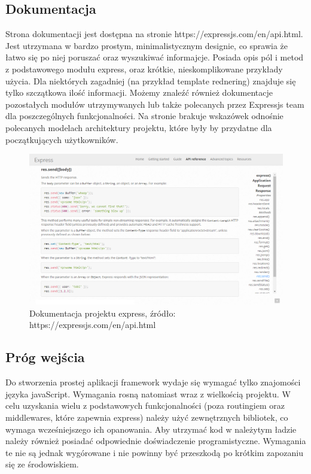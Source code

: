 \documentclass[12pt]{report}
\begin{document}
    \subsection{Dokumentacja}
      Strona dokumentacji jest dostępna na stronie https://expressjs.com/en/api.html.
      Jest utrzymana w bardzo prostym, minimalistycznym designie, co sprawia że łatwo się po niej poruszać oraz wyszukiwać informajcje.
      Posiada opis pól i metod z podstawowego modułu express, oraz krótkie, nieskomplikowane przykłady użycia.
      Dla niektórych zagadniej (na przykład template rednering) znajduje się tylko szczątkowa ilość informacji.
      Możemy znaleźć również dokumentacje pozostałych modułów utrzymywanych lub także polecanych przez Expressjs team dla poszczególnych funkcjonalności.
      Na stronie brakuje wskazówek odnośnie polecanych modelach architektury projektu, które były by przydatne dla początkujących użytkowników.
      \begin{figure}[!hb]
        \centering
        \includegraphics[width=\textwidth,height=\textheight,keepaspectratio]{doc_express.png} 
        \caption{Dokumentacja projektu express, źródło: https://expressjs.com/en/api.html}
      \end{figure}

    \subsection{Próg wejścia}
      Do stworzenia prostej aplikacji framework wydaje się wymagać tylko znajomości języka javaScript.
      Wymagania rosną natomiast wraz z wielkością projektu.
      W celu uzyskania wielu z podstawowych funkcjonalności (poza routingiem oraz middlewares, które zapewnia express) należy użyć zewnętrznych bibliotek, co wymaga wcześniejszego ich opanowania. 
      Aby utrzymać kod w należytym ładzie należy również posiadać odpowiednie doświadczenie programistyczne.
      Wymagania te nie są jednak wygórowane i nie powinny być przeszkodą po krótkim zapozaniu się ze środowiskiem.
\end{document}
